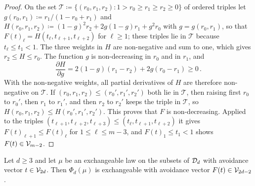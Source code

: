 \documentclass[11pt,letterpaper]{article}
\begin{document}
\begin{proof}
On the set $\mathcal T\coloneqq\{(r_0,r_1,r_2)\colon1>r_0\ge r_1\ge r_2\ge0\}$ of ordered triples let $g(r_0,r_1)\coloneqq r_1/(1-r_0+r_1)$ and $H(r_0,r_1,r_2)\coloneqq(1-g)^2r_2+2g(1-g)r_1+g^2r_0$ with $g=g(r_0,r_1)$, so that $F(t)_\ell=H(t_\ell,t_{\ell+1},t_{\ell+2})$ for $\ell\ge1$; these triples lie in $\mathcal T$ because $t_\ell\le t_1<1$. The three weights in $H$ are non-negative and sum to one, which gives $r_2\le H\le r_0$. The function $g$ is non-decreasing in $r_0$ and in $r_1$, and
\begin{equation*}
\frac{\partial H}{\partial g}=2(1-g)(r_1-r_2)+2g(r_0-r_1)\ge0\,.
\end{equation*}
With the non-negative weights, all partial derivatives of $H$ are therefore non-negative on $\mathcal T$. If $(r_0,r_1,r_2)\le(r_0',r_1',r_2')$ both lie in $\mathcal T$, then raising first $r_0$ to $r_0'$, then $r_1$ to $r_1'$, and then $r_2$ to $r_2'$ keeps the triple in $\mathcal T$, so $H(r_0,r_1,r_2)\le H(r_0',r_1',r_2')$. This proves that $F$ is non-decreasing. Applied to the triples $(t_{\ell+1},t_{\ell+2},t_{\ell+3})\le(t_\ell,t_{\ell+1},t_{\ell+2})$ it gives $F(t)_{\ell+1}\le F(t)_\ell$ for $1\le\ell\le m-3$, and $F(t)_1\le t_1<1$ shows $F(t)\in\mathcal V_{m-2}$.
\end{proof}

\begin{lemma}\label{lem:recursion}
Let $d\ge3$ and let $\mu$ be an exchangeable law on the subsets of $\mathcal D_d$ with avoidance vector $t\in\mathcal V_{2d}$. Then $\Phi_d(\mu)$ is exchangeable with avoidance vector $F(t)\in\mathcal V_{2d-2}$.
\end{lemma}
\end{document}
